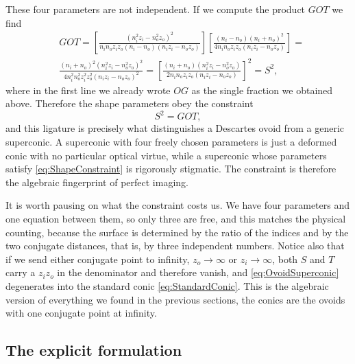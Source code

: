                 These four parameters are not independent. If we compute the product $GOT$ we find
                \begin{align*}
                    & GOT = \left[ \frac{\left( n_i^2z_i - n_o^2z_o \right)^2}{n_in_oz_iz_o\left(n_i-n_o\right)\left( n_iz_i - n_oz_o \right)} \right]\left[ \frac{\left( n_i-n_o \right)\left( n_i+n_o \right)^2}{4n_in_oz_iz_o\left( n_iz_i-n_oz_o \right)} \right] = \\
                    & \frac{\left( n_i+n_o \right)^2\left( n_i^2z_i - n_o^2z_o \right)^2}{4n_i^2n_o^2z_i^2z_o^2\left( n_iz_i - n_oz_o \right)^2} = \left[ \frac{\left( n_i+n_o \right)\left( n_i^2z_i - n_o^2z_o \right)}{2n_in_oz_iz_o\left( n_iz_i-n_oz_o \right)} \right]^2 = S^2,
                \end{align*}
                where in the first line we already wrote $OG$ as the single fraction we obtained above. Therefore the shape parameters obey the constraint
                \begin{equation}\label{eq:ShapeConstraint}
                    S^2 = GOT,
                \end{equation}
                and this ligature is precisely what distinguishes a Descartes ovoid from a generic superconic. A superconic with four freely chosen parameters is just a deformed conic with no particular optical virtue, while a superconic whose parameters satisfy \ref{eq:ShapeConstraint} is rigorously stigmatic. The constraint is therefore the algebraic fingerprint of perfect imaging.

                It is worth pausing on what the constraint costs us. We have four parameters and one equation between them, so only three are free, and this matches the physical counting, because the surface is determined by the ratio of the indices and by the two conjugate distances, that is, by three independent numbers. Notice also that if we send either conjugate point to infinity, $z_o\to\infty$ or $z_i\to\infty$, both $S$ and $T$ carry a $z_iz_o$ in the denominator and therefore vanish, and \ref{eq:OvoidSuperconic} degenerates into the standard conic \ref{eq:StandardConic}. This is the algebraic version of everything we found in the previous sections, the conics are the ovoids with one conjugate point at infinity.

            \subsection{The explicit formulation}

